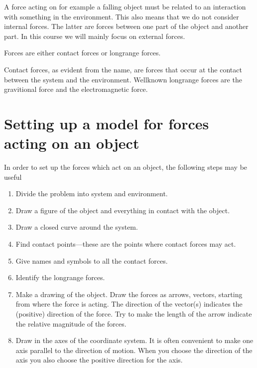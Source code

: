 \documentclass[letterpaper,10pt,english]{sphinxmanual}
\begin{document}
A force acting on for example a falling object must be related to an interaction with something in the environment.
This also means that we do not consider internal forces. The latter are forces between
one part of the object and another part. In this course we will mainly focus on external forces.

Forces are either contact forces or long\sphinxhyphen{}range forces.

Contact forces, as evident from the name, are forces that occur at the contact between
the system and the environment. Well\sphinxhyphen{}known long\sphinxhyphen{}range forces are the gravitional force and the electromagnetic force.


\section{Setting up a model for forces acting on an object}
\label{\detokenize{chapter1:setting-up-a-model-for-forces-acting-on-an-object}}
In order to set up the forces which act on an object, the following steps may be useful
\begin{enumerate}
%
\item {} 
Divide the problem into system and environment.

\item {} 
Draw a figure of the object and everything in contact with the object.

\item {} 
Draw a closed curve around the system.

\item {} 
Find contact points—these are the points where contact forces may act.

\item {} 
Give names and symbols to all the contact forces.

\item {} 
Identify the long\sphinxhyphen{}range forces.

\item {} 
Make a drawing of the object. Draw the forces as arrows, vectors, starting from where the force is acting. The direction of the vector(s) indicates the (positive) direction of the force. Try to make the length of the arrow indicate the relative magnitude of the forces.

\item {} 
Draw in the axes of the coordinate system. It is often convenient to make one axis parallel to the direction of motion. When you choose the direction of the axis you also choose the positive direction for the axis.

\end{enumerate}
\end{document}
